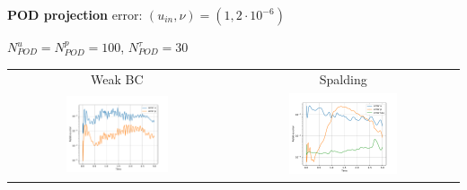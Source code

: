 \documentclass[9pt,compress,t,aspectratio=169]{beamer}
\newcommand{\1}{\begin{pmatrix}
		1\\
		1
\end{pmatrix}}
\newcommand{\highlight}[1]{\textbf{\color{bluemathlab}#1}}
\newcommand{\highlightB}[1]{\textbf{\color{black!15!orangemathlab}#1}}
\begin{document}
\begin{frame}{\highlight{POD projection }error: $(u_{in},\nu)=(1,2\cdot 10^{-6})$}
	\begin{center}
		$N_{POD}^u=N_{POD}^p=100$, $N_{POD}^\tau=30$
		\begin{tabular}{cc}
			Weak BC& Spalding\\
			\includegraphics[width=0.49\textwidth]{figures/cylinder_turb_weak_errors_vs_time_proj.pdf}&
			\includegraphics[width=0.49\textwidth]{figures/cylinder_turb_spalding_errors_vs_time_proj.pdf}
		\end{tabular}
	\end{center}
\end{frame}

\end{document}
